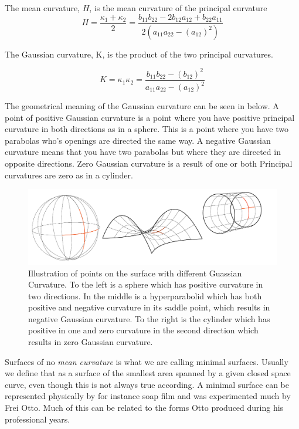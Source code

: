 The mean curvature, $H$, is the mean curvature of the principal curvature
\begin{equation}
H = \frac{\kappa_1 + \kappa_2}{2} =\frac{b_{11}b_{22} - 2b_{12}a_{12} + b_{22}a_{11}}{2(a_{11}a_{22} - (a_{12})^2)}
\end{equation}

The Gaussian curvature, K, is the product of the two
principal curvatures.

\begin{equation}
K = {\kappa_1 \kappa_2} = \frac{b_{11} b_{22} - (b_{12})^2}{a_{11}a_{22} - (a_{12})^2}
\end{equation}

The geometrical meaning of the Gaussian curvature can be seen in below.  A point of positive Gaussian curvature is a point where you have positive principal curvature in both directions as in a sphere. This is a point where you have two parabolas who's openings are directed the same way. A negative Gaussian curvature means that you have two parabolas but where they are directed in opposite directions. Zero Gaussian curvature is a result of one or both Principal curvatures are zero as in a cylinder. 

\begin{figure}[H] 
\centering
\includegraphics[width=1\linewidth ]{figure/Theory/GaussForms.pdf}
\caption{Illustration of points on the surface with different Guassian Curvature. To the left is a sphere which has positive curvature in two directions. In the middle is a hyperparabolid which has both positive and negative curvature in its saddle point, which results in negative Gaussian curvature. To the right is the cylinder which has positive in one and zero curvature in the second direction which results in zero Gaussian curvature. }
\end{figure}

Surfaces of no \textit{mean curvature} is what we are calling minimal surfaces. Usually we define that as a surface of the smallest area spanned by a given closed space curve, even though this is not always true according. \cite{ref:Struik} 
A minimal surface can be represented physically by for instance soap film and was experimented much by Frei Otto. Much of this can be related to the forms Otto produced during his professional years. 

